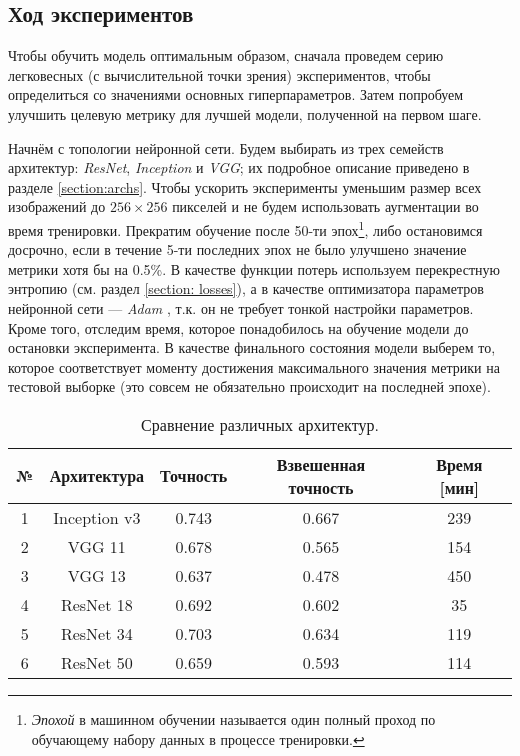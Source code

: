 \subsection{Ход экспериментов}

\indent
\indent
Чтобы обучить модель оптимальным образом, сначала проведем серию
легковесных (с вычислительной точки зрения) экспериментов, чтобы определиться 
со значениями основных гиперпараметров. Затем попробуем улучшить целевую метрику
для лучшей модели, полученной на первом шаге.

\indent
\indent
Начнём с топологии нейронной сети. Будем выбирать из трех семейств архитектур:
\textit{ResNet}, \textit{Inception} и \textit{VGG};
их подробное описание приведено в разделе \ref{section:archs}.
Чтобы ускорить эксперименты уменьшим размер всех изображений до
$256 \times 256$ пикселей и не будем использовать аугментации во время тренировки.
Прекратим обучение после 50-ти
эпох\footnote{\textit{Эпохой} в машинном обучении называется один полный проход по
обучающему набору данных в процессе тренировки.}, либо остановимся досрочно,
если в течение 5-ти последних эпох не было улучшено 
значение метрики хотя бы на 0.5\%. В качестве функции потерь используем
 перекрестную энтропию (см. раздел \ref{section: losses}),
 а в качестве оптимизатора параметров 
нейронной сети --- \textit{Adam} \cite{adam}, т.к. он не требует тонкой настройки
параметров. Кроме того, отследим время, которое 
понадобилось на обучение модели до остановки эксперимента.
В качестве финального состояния модели выберем
то, которое соответствует моменту достижения максимального значения метрики
на тестовой выборке (это совсем не обязательно происходит на последней эпохе).


\begin{table}[h!]
    \begin{center}
        \begin{tabular}{c | c| c | c | c}
            \hline
            № & Архитектура & Точность & Взвешенная точность  & Время [мин] \\
            \hline
    
            1 & Inception v3 & 0.743 & 0.667 & 239 \\
            
            2 & VGG 11 & 0.678 & 0.565 & 154 \\
            
            3 & VGG 13 & 0.637 & 0.478 & 450 \\
            
            4 & ResNet 18 & 0.692 & 0.602 & 35 \\
            
            5 & ResNet 34 & 0.703 & 0.634 & 119 \\
            
            6 & ResNet 50 & 0.659 & 0.593 & 114 \\
    
            \hline
        \end{tabular}
    \end{center}
    \caption{Сравнение различных архитектур.}
    \label{tabular: arch_compare}
\end{table}


